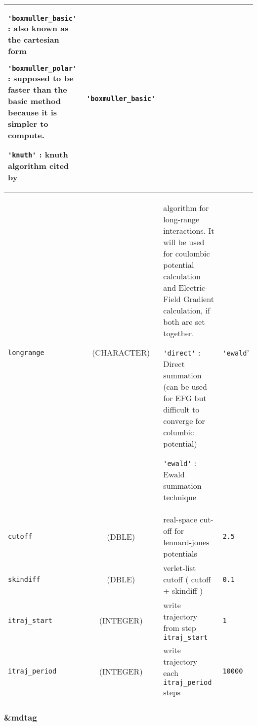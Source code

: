 \documentclass[a4paper]{article}
\begin{document}
\begin{longtable}{l|c|m{8cm}|m{2cm}}
                                        \verb?'boxmuller_basic'? : also known as the cartesian form  \newline

					\verb?'boxmuller_polar'? : supposed to be faster than the basic method because it is 
					simpler to compute.     \newline

					\verb?'knuth'? : knuth algorithm cited by~\cite{B-ALLEN_TILDESLEY} \newline          & \verb?'boxmuller_basic'? \tabularnewline
\hline
\rule[-0.75cm]{0cm}{1.5cm}
\verb?longrange? & (CHARACTER)        & \newline algorithm for long-range interactions. It will be used for coulombic potential 
                                        calculation and Electric-Field Gradient calculation, if both are set together. \newline

					\verb?'direct'? : Direct summation (can be used for EFG but difficult to converge for columbic potential) \newline

					\verb?'ewald'? : Ewald summation technique \newline                                &  \verb?'ewald?'      \tabularnewline
\hline
\rule[-0.75cm]{0cm}{1.5cm}
\verb?cutoff?    & (DBLE)             &  real-space cut-off for lennard-jones potentials                                   & \verb?2.5?\\
\hline
\rule[-0.75cm]{0cm}{1.5cm}
\verb?skindiff?  & (DBLE)             &  verlet-list cutoff ( cutoff + skindiff )                                          & \verb?0.1?\\
\hline
\hline
\rule[-0.75cm]{0cm}{1.5cm}
\verb?itraj_start?   & (INTEGER)      &  write trajectory from step \verb?itraj_start?                                      & \verb?1? \\
\hline
\rule[-0.75cm]{0cm}{1.5cm}
\verb?itraj_period?  & (INTEGER)      &  write trajectory each \verb?itraj_period? steps                                    & \verb?10000? \\
\hline
\end{longtable}

\subsubsection{\&mdtag}
\end{document}
